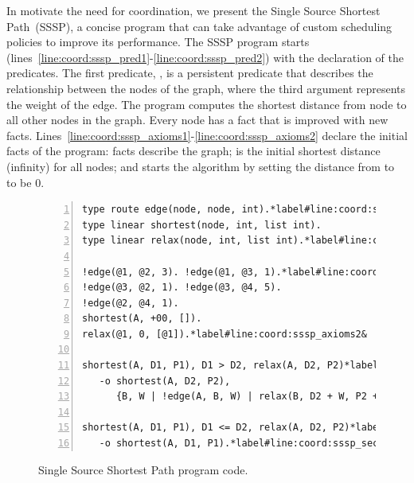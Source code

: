 In motivate the need for coordination, we present the Single Source Shortest
Path~(SSSP), a concise program that can take advantage of custom scheduling
policies to improve its performance. The SSSP program starts
(lines~\ref{line:coord:sssp_pred1}-\ref{line:coord:sssp_pred2}) with the
declaration of the predicates. The first predicate, , is a persistent
predicate that describes the relationship between the nodes of the graph, where
the third argument represents the weight of the edge.  The program computes the
shortest distance from node  to all other nodes in the graph. Every
node has a  fact that is improved with new  facts.
Lines~\ref{line:coord:sssp_axioms1}-\ref{line:coord:sssp_axioms2} declare the
initial facts of the program:  facts describe the graph;  is the initial shortest distance (infinity) for all nodes; and
 starts the algorithm by setting the distance from
 to  to be 0.

\begin{figure}[ht]
\begin{Verbatim}[numbers=left,fontsize=\codesize,commandchars=\*\#\&]
type route edge(node, node, int).*label#line:coord:sssp_pred1&
type linear shortest(node, int, list int).
type linear relax(node, int, list int).*label#line:coord:sssp_pred2&

!edge(@1, @2, 3). !edge(@1, @3, 1).*label#line:coord:sssp_axioms1&
!edge(@3, @2, 1). !edge(@3, @4, 5).
!edge(@2, @4, 1).
shortest(A, +00, []).
relax(@1, 0, [@1]).*label#line:coord:sssp_axioms2&

shortest(A, D1, P1), D1 > D2, relax(A, D2, P2)*label#line:coord:sssp_first1&
   -o shortest(A, D2, P2),
      {B, W | !edge(A, B, W) | relax(B, D2 + W, P2 ++ [B])}.*label#line:coord:sssp_first2&

shortest(A, D1, P1), D1 <= D2, relax(A, D2, P2)*label#line:coord:sssp_second1&
   -o shortest(A, D1, P1).*label#line:coord:sssp_second2&
\end{Verbatim}
\caption{Single Source Shortest Path program code.}
\label{code:shortest_path_program}
\end{figure}

